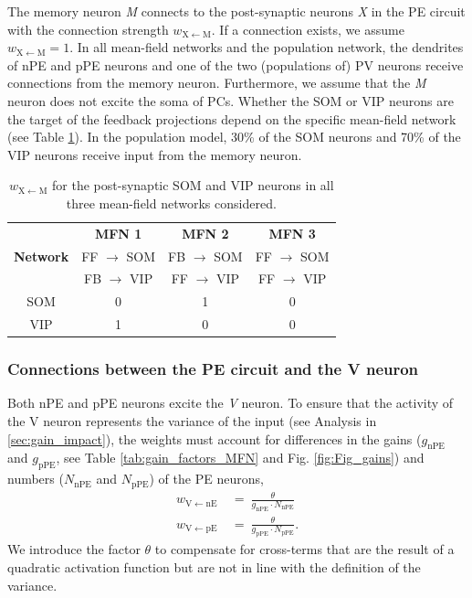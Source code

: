 \documentclass[10pt,a4paper,draft]{article}
\begin{document}
The memory neuron \textit{M} connects to the post-synaptic neurons \textit{X} in the PE circuit with the connection strength $w_\mathrm{X\leftarrow M}$. If a connection exists, we assume $w_\mathrm{X\leftarrow M} = 1$. In all mean-field networks and the population network, the dendrites of nPE and pPE neurons and one of the two (populations of) PV neurons receive connections from the memory neuron. Furthermore, we assume that the \textit{M} neuron does not excite the soma of PCs. Whether the SOM or VIP neurons are the target of the feedback projections depend on the specific mean-field network (see Table \ref{tab:wXM}). In the population model, 30\% of the SOM neurons and 70\% of the VIP neurons receive input from the memory neuron.
%
\begin{table}[h!]
\centering
\begin{tabular}{ |c|c|c|c|  }
\hline
 & \textbf{MFN 1} & \textbf{MFN 2} & \textbf{MFN 3}  \\
\textbf{Network} & FF $\rightarrow$ SOM  & FB $\rightarrow$ SOM  & FF $\rightarrow$ SOM  \\
 & FB $\rightarrow$ VIP  & FF $\rightarrow$ VIP  & FF $\rightarrow$ VIP  \\
\hline
\hline
SOM & 0 & 1 & 0\\
VIP & 1 & 0 & 0 \\
\hline
\end{tabular}
\caption{\footnotesize{$w_\mathrm{X\leftarrow M}$ for the post-synaptic SOM and VIP neurons in all three mean-field networks considered.}}
\label{tab:wXM}
\end{table}
%

\subsubsection{Connections between the PE circuit and the V neuron}
%
Both nPE and pPE neurons excite the \textit{V} neuron. To ensure that the activity of the V neuron represents the variance of the input (see Analysis in \ref{sec:gain_impact}), the weights must account for differences in the gains ($g_\mathrm{nPE}$ and $g_\mathrm{pPE}$, see Table \ref{tab:gain_factors_MFN} and Fig. \ref{fig:Fig_gains}) and numbers ($N_\mathrm{nPE}$ and $N_\mathrm{pPE}$) of the PE neurons,
%
\begin{align*}
w_\mathrm{V\leftarrow nE}\  &=\ \frac{\theta}{g_\mathrm{nPE} \cdot N_\mathrm{nPE}} \nonumber\\
w_\mathrm{V\leftarrow pE}\  &=\ \frac{\theta}{g_\mathrm{pPE} \cdot N_\mathrm{pPE}}.
\end{align*}
%
We introduce the factor $\theta$ to compensate for cross-terms that are the result of a quadratic activation function but are not in line with the definition of the variance. 
\end{document}
